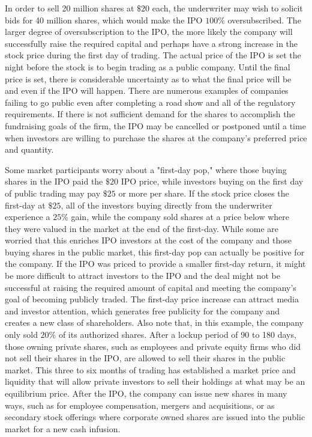 \documentclass[11pt]{article}
\begin{document}
In order to sell 20 million shares at $\$ 20$ each, the underwriter may wish to solicit bids for 40 million shares, which would make the IPO $100 \%$ oversubscribed. The larger degree of oversubscription to the IPO, the more likely the company will successfully raise the required capital and perhaps have a strong increase in the stock price during the first day of trading. The actual price of the IPO is set the night before the stock is to begin trading as a public company. Until the final price is set, there is considerable uncertainty as to what the final price will be and even if the IPO will happen. There are numerous examples of companies failing to go public even after completing a road show and all of the regulatory requirements. If there is not sufficient demand for the shares to accomplish the fundraising goals of the firm, the IPO may be cancelled or postponed until a time when investors are willing to purchase the shares at the company's preferred price and quantity.

Some market participants worry about a "first-day pop," where those buying shares in the IPO paid the $\$ 20$ IPO price, while investors buying on the first day of public trading may pay $\$ 25$ or more per share. If the stock price closes the first-day at $\$ 25$, all of the investors buying directly from the underwriter experience a $25 \%$ gain, while the company sold shares at a price below where they were valued in the market at the end of the first-day. While some are worried that this enriches IPO investors at the cost of the company and those buying shares in the public market, this first-day pop can actually be positive for the company. If the IPO was priced to provide a smaller first-day return, it might be more difficult to attract investors to the IPO and the deal might not be successful at raising the required amount of capital and meeting the company's goal of becoming publicly traded. The first-day price increase can attract media and investor attention, which generates free publicity for the company and creates a new class of shareholders. Also note that, in this example, the company only sold $20 \%$ of its authorized shares. After a lockup period of 90 to 180 days, those owning private shares, such as employees and private equity firms who did not sell their shares in the IPO, are allowed to sell their shares in the public market. This three to six months of trading has established a market price and liquidity that will allow private investors to sell their holdings at what may be an equilibrium price. After the IPO, the company can issue new shares in many ways, such as for employee compensation, mergers and acquisitions, or as secondary stock offerings where corporate owned shares are issued into the public market for a new cash infusion.
\end{document}
